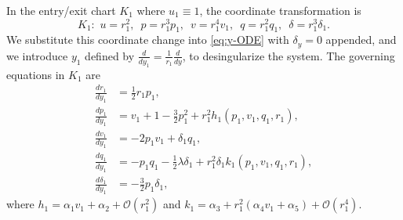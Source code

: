 \documentclass[11pt]{article}
\numberwithin{equation}{section}
\begin{document}
In the entry/exit chart $K_1$ where $u_1\equiv 1$, the coordinate transformation is
\begin{equation} \label{eq:K1-coords}
K_1: \, \, 
  u = r_1^2, \, \,  \,
  p = r_1^3 p_1, \, \,  \,
  v = r_1^4 v_1, \, \,  \, 
  q = r_1^2 q_1, \, \,  \,
  \delta=r_1^3 \delta_1.    
\end{equation}
We substitute this coordinate change into \eqref{eq:y-ODE} with $\delta_y=0$ appended, and we introduce $y_1$ defined by $\frac{d}{dy_1} = \frac{1}{r_1} \frac{d}{dy}$, to desingularize the system.
The governing equations in $K_1$ are
\begin{equation} \label{eq:K1}
\begin{split} 
    \frac{dr_1}{dy_1} &= \frac{1}{2} r_1 p_1, \\
    \frac{dp_1}{dy_1} &= v_1 + 1 - \frac{3}{2} p_1^2 + r_1^2 h_1(p_1,v_1,q_1,r_1), \\
    \frac{dv_1}{dy_1} &= -2p_1v_1 + \delta_1 q_1, \\
    \frac{dq_1}{dy_1} &= -p_1q_1 -\frac{1}{2}\lambda \delta_1 + r_1^2 \delta_1 k_1(p_1,v_1,q_1,r_1), \\
    \frac{d\delta_1}{dy_1} &= - \frac{3}{2} p_1 \delta_1,
\end{split}
\end{equation}
where $h_1= \alpha_1 v_1 + \alpha_2 + \mathcal{O}(r_1^2)$
and $k_1= \alpha_3 + r_1^2 (\alpha_4 v_1 + \alpha_5) + \mathcal{O}(r_1^4)$.
\end{document}
